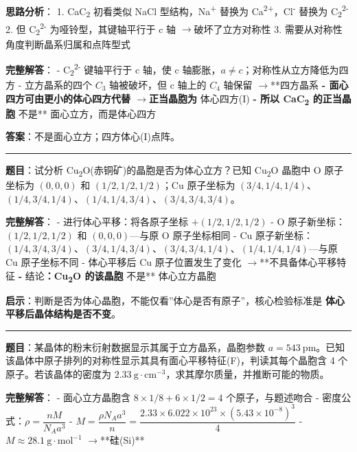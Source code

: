 \documentclass[a4paper,11pt]{ctexart}
\newcommand{\箭}{\ensuremath{\rightarrow}}
\newcommand{\左箭}{\ensuremath{\leftarrow}}
\newcommand{\上箭}{\ensuremath{\uparrow}}
\newcommand{\下箭}{\ensuremath{\downarrow}}
\newcommand{\衡}{\ensuremath{\rightleftharpoons}}
\newcommand{\双箭}{\ensuremath{\leftrightarrow}}
\newcommand{\约等于}{\ensuremath{\approx}}
\newcommand{\小于等于}{\ensuremath{\leq}}
\newcommand{\大于等于}{\ensuremath{\geq}}
\newcommand{\不等于}{\ensuremath{\neq}}
\newcommand{\西格马}{\ensuremath{\sigma}}
\newcommand{\派}{\ensuremath{\pi}}
\begin{document}
\textbf{思路分析}：
1. CaC\textsubscript{2} 初看类似 NaCl 型结构，Na\textsuperscript{+} 替换为 Ca\textsuperscript{2+}，Cl\textsuperscript{-} 替换为 C\textsubscript{2}\textsuperscript{2-}
2. 但 C\textsubscript{2}\textsuperscript{2-} 为哑铃型，其键轴平行于 c 轴 \箭 破坏了立方对称性
3. 需要从对称性角度判断晶系归属和点阵型式

\textbf{完整解答}：
- C\textsubscript{2}\textsuperscript{2-} 键轴平行于 c 轴，使 c 轴膨胀，\(a \neq c\)；对称性从立方降低为四方
- 立方晶系的四个 \(C_3\) 轴被破坏，但 c 轴上的 \(C_4\) 轴保留 \箭 **四方晶系\textbf{
- 面心四方可由更小的体心四方代替 \箭 正当晶胞为 }体心四方(I)\textbf{
- 所以 CaC\textsubscript{2} 的正当晶胞 }不是** 面心立方，而是体心四方

\textbf{答案}：不是面心立方；四方体心(I)点阵。

\begin{center}\rule{0.5\linewidth}{0.5pt}\end{center}

\textbf{题目}：试分析 Cu\textsubscript{2}O(赤铜矿)的晶胞是否为体心立方？已知 Cu\textsubscript{2}O 晶胞中 O 原子坐标为 \((0, 0, 0)\) 和 \((1/2, 1/2, 1/2)\)；Cu 原子坐标为 \((3/4, 1/4, 1/4)\)、\((1/4, 3/4, 1/4)\)、\((1/4, 1/4, 3/4)\)、\((3/4, 3/4, 3/4)\)。

\textbf{完整解答}：
- 进行体心平移：将各原子坐标 \(+(1/2, 1/2, 1/2)\)
- O 原子新坐标：\((1/2, 1/2, 1/2)\) 和 \((0, 0, 0)\)---与原 O 原子坐标相同
- Cu 原子新坐标：\((1/4, 3/4, 3/4)\)、\((3/4, 1/4, 3/4)\)、\((3/4, 3/4, 1/4)\)、\((1/4, 1/4, 1/4)\)---与原 Cu 原子坐标不同
- 体心平移后 Cu 原子位置发生了变化 \箭 **不具备体心平移特征\textbf{
- }结论\textbf{：Cu\textsubscript{2}O 的该晶胞 }不是** 体心立方晶胞

\textbf{启示}：判断是否为体心晶胞，不能仅看''体心是否有原子''，核心检验标准是 \textbf{体心平移后晶体结构是否不变}。

\begin{center}\rule{0.5\linewidth}{0.5pt}\end{center}

\textbf{题目}：某晶体的粉末衍射数据显示其属于立方晶系，晶胞参数 \(a = 543\ \mathrm{pm}\)。已知该晶体中原子排列的对称性显示其具有面心平移特征(F)，判读其每个晶胞含 4 个原子。若该晶体的密度为 \(2.33\ \mathrm{g\cdot cm^{-3}}\)，求其摩尔质量，并推断可能的物质。

\textbf{完整解答}：
- 面心立方晶胞含 \(8 \times 1/8 + 6 \times 1/2 = 4\) 个原子，与题述吻合
- 密度公式：\(\rho = \dfrac{nM}{N_A a^3}\)
- \(M = \dfrac{\rho N_A a^3}{n} = \dfrac{2.33 \times 6.022\times 10^{23} \times (5.43\times 10^{-8})^3}{4}\)
- \(M \approx 28.1\ \mathrm{g\cdot mol^{-1}}\) \箭 **硅(Si)**
\end{document}
